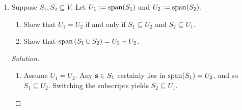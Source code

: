 \documentclass[11pt]{amsart}
\begin{document}
\begin{enumerate}[(1)]
\begin{proof}[Solution]
\begin{enumerate}

\item We claim that $B := \left( (30,6,5,0,0), (0,0,0,1,0), (0,0,0,0,1) \right)$ is a basis for $U$.
The list $B$ is linearly independent because
\[
  a (30,6,5,0,0) + b (0,0,0,1,0) + c (0,0,0,0,1) = (30a, 6a, 5a, b, c) = (0,0,0,0,0)
\]
implies that $a = b = c = 0$.
The list $B$ spans $U$ because any vector in $U$ is by definition of the form $\left( x_1, \tfrac 1 5 x_1 , \tfrac 1 6 x_1, x_4, x_5 \right)$, and
\[
  \left( x_1, \tfrac 1 5 x_1 , \tfrac 1 6 x_1, x_4, x_5 \right) = x_1 (30,6,5,0,0) + x_4 (0,0,0,1,0) + x_5 (0,0,0,0,1) \, .
\]

\item We claim that $C := \left( (30,6,5,0,0), (0,0,0,1,0), (0,0,0,0,1), (1,0,0,0,0), (0,1,0,0,0) \right)$ is such a basis for $\R^5$.
The list $C$ is linearly independent because
\begin{align*}
  &a (30,6,5,0,0) + b (0,0,0,1,0) + c (0,0,0,0,1) + d (1,0,0,0,0) + e (0,1,0,0,0) \\
  &\qquad = (30a+d, 6a+e, 5a, b, c) = (0,0,0,0,0)
\end{align*}
implies that $a = b = c = d = e = 0$.
The list $C$ spans $\R^5$ because
\begin{align*}
  \left( x_1, x_2, x_3, x_4, x_5 \right) = &\tfrac 1 5 x_3 (30,6,5,0,0) + x_4 (0,0,0,1,0) + x_5 (0,0,0,0,1) + \\
  &\qquad + \left( x_1 - 6 x_3 \right) (1,0,0,0,0) + \left( x_2 - \tfrac 6 5 x_3 \right) (0,1,0,0,0) \, . \qedhere
\end{align*}
\end{enumerate}
\end{proof}

\item Suppose $S_1,S_2 \subseteq V$. Let $U_1 := \operatorname{span}(S_1)$ and $U_2 := \operatorname{span}(S_2)$.
  \begin{enumerate}
  \item Show that $U_1 = U_2$ if and only if $S_1 \subseteq U_2$ and $S_2 \subseteq U_1$.
  \item Show that $\operatorname{span} \left( S_1 \cup S_2 \right) = U_1 + U_2$.
  \end{enumerate}

\begin{proof}[Solution]
\begin{enumerate}

\item Assume $U_1 = U_2$.
Any $\mathbf{s} \in S_1$ certainly lies in $\operatorname{span}(S_1) = U_2$, and so $S_1 \subseteq U_2$.
Switching the subscripts yields $S_2 \subseteq U_1$.


\end{enumerate}
\end{proof}
\end{enumerate}
\end{document}
